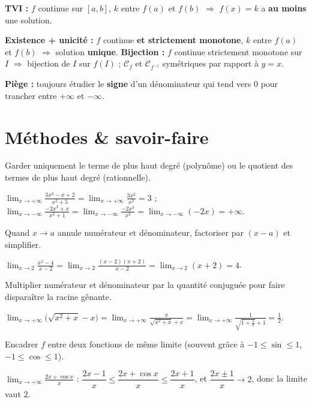 \begin{synthese}
\smallskip
\textbf{TVI :} $f$ continue sur $[a,b]$, $k$ entre $f(a)$ et $f(b)$ $\Rightarrow$ $f(x)=k$ a \textbf{au moins} une solution.

\smallskip
\textbf{Existence + unicité :} $f$ continue \textbf{et strictement monotone}, $k$ entre $f(a)$ et $f(b)$ $\Rightarrow$ solution \textbf{unique}. \textbf{Bijection :} $f$ continue strictement monotone sur $I$ $\Rightarrow$ bijection de $I$ sur $f(I)$ ; $\mathcal C_f$ et $\mathcal C_{f^{-1}}$ symétriques par rapport à $y=x$.

\smallskip
\textbf{Piège :} toujours étudier le \textbf{signe} d'un dénominateur qui tend vers $0$ pour trancher entre $+\infty$ et $-\infty$.
\end{synthese}

\section{Méthodes \& savoir-faire}

Garder uniquement le terme de plus haut degré (polynôme) ou le quotient des termes de plus haut degré (rationnelle).
\begin{exemple}
$\displaystyle\lim_{x\to+\infty}\frac{3x^{2}-x+2}{x^{2}+5}=\lim_{x\to+\infty}\frac{3x^{2}}{x^{2}}=3$ ; \quad
$\displaystyle\lim_{x\to-\infty}\frac{-2x^{3}+x}{x^{2}+1}=\lim_{x\to-\infty}\frac{-2x^{3}}{x^{2}}=\lim_{x\to-\infty}(-2x)=+\infty$.
\end{exemple}

Quand $x\to a$ annule numérateur et dénominateur, factoriser par $(x-a)$ et simplifier.
\begin{exemple}
$\displaystyle\lim_{x\to2}\frac{x^{2}-4}{x-2}=\lim_{x\to2}\frac{(x-2)(x+2)}{x-2}=\lim_{x\to2}(x+2)=4$.
\end{exemple}

Multiplier numérateur et dénominateur par la quantité conjuguée pour faire disparaître la racine gênante.
\begin{exemple}
$\displaystyle\lim_{x\to+\infty}\big(\sqrt{x^{2}+x}-x\big)=\lim_{x\to+\infty}\frac{x}{\sqrt{x^{2}+x}+x}=\lim_{x\to+\infty}\frac{1}{\sqrt{1+\frac1x}+1}=\frac12.$
\end{exemple}

Encadrer $f$ entre deux fonctions de même limite (souvent grâce à $-1\le\sin\le1$, $-1\le\cos\le1$).
\begin{exemple}
$\displaystyle\lim_{x\to+\infty}\frac{2x+\cos x}{x}$ : $\dfrac{2x-1}{x}\le\dfrac{2x+\cos x}{x}\le\dfrac{2x+1}{x}$, et $\dfrac{2x\pm1}{x}\to2$, donc la limite vaut $2$.
\end{exemple}

